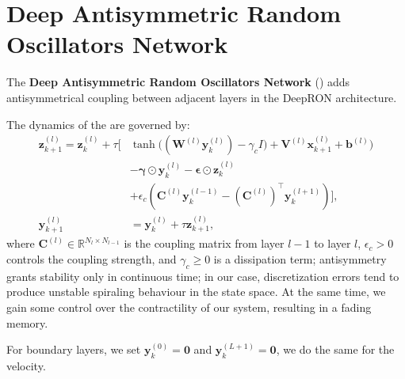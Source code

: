 
\section{Deep Antisymmetric Random Oscillators Network}
\label{sec:method:dao}

The \textbf{Deep Antisymmetric Random Oscillators Network} (\DAO) adds antisymmetrical coupling between adjacent layers in the DeepRON architecture.

The dynamics of the \DAO\@ are governed by:
\begin{equation}
\label{eq:method:dao_dynamics}
\begin{aligned}
    \mathbf{z}^{(l)}_{k+1} = \mathbf{z}^{(l)}_k + \tau \Bigg[ & \tanh\Big((\mathbf{W}^{(l)}\mathbf{y}^{(l)}_k)- \gamma_c I) + \mathbf{V}^{(l)}\mathbf{x}^{(l)}_{k+1} + \mathbf{b}^{(l)}\Big) \\
    & - \bm{\gamma} \odot \mathbf{y}^{(l)}_k - \bm{\epsilon} \odot \mathbf{z}^{(l)}_k \\
    & + \epsilon_c \left( \mathbf{C}^{(l)} \mathbf{y}^{(l-1)}_k - (\mathbf{C}^{(l)})^\top \mathbf{y}^{(l+1)}_k \right) \Bigg], \\
    \mathbf{y}^{(l)}_{k+1} &= \mathbf{y}^{(l)}_k + \tau \mathbf{z}^{(l)}_{k+1},
\end{aligned}
\end{equation}
where $\mathbf{C}^{(l)} \in \mathbb{R}^{N_l \times N_{l-1}}$ is the coupling matrix from layer $l-1$ to layer $l$, 
$\epsilon_c > 0$ controls the coupling strength, and $\gamma_c \geq 0$ is a dissipation term; antisymmetry
grants stability only in continuous time; in our case, discretization errors tend to produce unstable spiraling behaviour in the state space. At the same time, we gain some control over the contractility of our system, resulting in a fading memory.

For boundary layers, we set $\mathbf{y}^{(0)}_k = \mathbf{0}$ and $\mathbf{y}^{(L+1)}_k = \mathbf{0}$, we do the same for the velocity.


